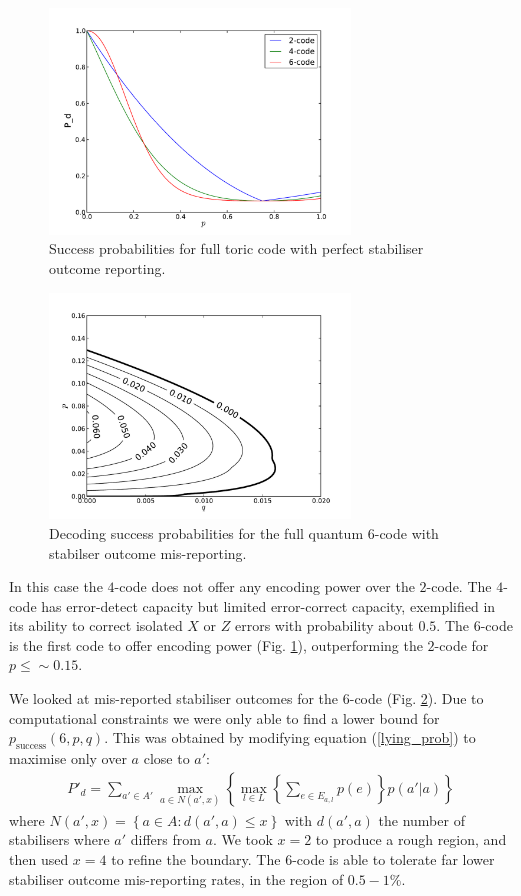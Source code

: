 \begin{figure}[htb]
  \begin{center}
    \includegraphics[width=8cm]{assets/full_truthful.pdf}
  \end{center}
  \caption{Success probabilities for full toric code with perfect stabiliser outcome reporting.}
  \label{full_truthful}
\end{figure}
\begin{figure}[htb]
  \begin{center}
    \includegraphics[width=8cm]{assets/full_lying.pdf}
  \end{center}
  \caption{Decoding success probabilities for the full quantum $6$-code with stabilser outcome mis-reporting.}
  \label{full_lying}
\end{figure}


In this case the $4$-code does not offer any encoding power over the $2$-code. The $4$-code has error-detect capacity but limited error-correct capacity, exemplified in its ability to correct isolated $X$ or $Z$ errors with probability about $0.5$. The $6$-code is the first code to offer encoding power (Fig. \ref{full_truthful}), outperforming the $2$-code for $p \le \sim 0.15$.

We looked at mis-reported stabiliser outcomes for the $6$-code (Fig. \ref{full_lying}). Due to computational constraints we were only able to find a lower bound for $p_{\text{success}}(6, p, q)$. This was obtained by modifying equation (\ref{lying_prob}) to maximise only over $a$ close to $a'$:
\begin{align} \label{approx_eq}
  P'_d= \sum_{a'\in A'} \max_{a \in N(a',x)} \left\{ \max_{l \in L} \left\{\sum_{e \in E_{a,l}} p(e) \right\} p(a' \vert a) \right\}
\end{align}
where $N(a', x) = \left\{a \in A : d(a', a) \leq x \right\}$ with $d(a', a)$ the number of stabilisers where $a'$ differs from $a$. We took $x = 2$ to produce a rough region, and then used $x=4$ to refine the boundary. The $6$-code is able to tolerate far lower stabiliser outcome mis-reporting rates, in the region of $0.5 - 1\%$.

